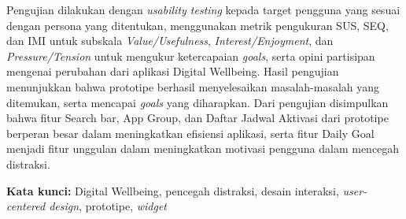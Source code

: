 \begin{singlespace}
  Pengujian dilakukan dengan \textit{usability testing} kepada target pengguna yang sesuai dengan persona yang ditentukan, menggunakan metrik pengukuran SUS, SEQ, dan IMI untuk subskala \textit{Value/Usefulness}, \textit{Interest/Enjoyment}, dan \textit{Pressure/Tension} untuk mengukur ketercapaian \textit{goals}, serta opini partisipan mengenai perubahan dari aplikasi Digital Wellbeing.
  Hasil pengujian menunjukkan bahwa prototipe berhasil menyelesaikan masalah-masalah yang ditemukan, serta mencapai \textit{goals} yang diharapkan.
  Dari pengujian disimpulkan bahwa fitur Search bar, App Group, dan Daftar Jadwal Aktivasi dari prototipe berperan besar dalam meningkatkan efisiensi aplikasi, serta fitur Daily Goal menjadi fitur unggulan dalam meningkatkan motivasi pengguna dalam mencegah distraksi.

\noindent \textbf{Kata kunci:} Digital Wellbeing, pencegah distraksi, desain interaksi, \textit{user-centered design}, prototipe, \textit{widget}
\end{singlespace}